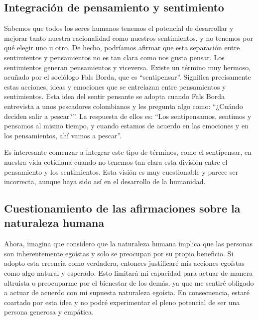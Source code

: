 \documentclass[
  letterpaper,
  DIV=11,
  numbers=noendperiod]{scrartcl}
\begin{document}
\hypertarget{integraciuxf3n-de-pensamiento-y-sentimiento}{%
\subsection{Integración de pensamiento y
sentimiento}\label{integraciuxf3n-de-pensamiento-y-sentimiento}}

Sabemos que todos los seres humanos tenemos el potencial de desarrollar
y mejorar tanto nuestra racionalidad como nuestros sentimientos, y no
tenemos por qué elegir uno u otro. De hecho, podríamos afirmar que esta
separación entre sentimientos y pensamientos no es tan clara como nos
gusta pensar. Los sentimientos generan pensamientos y viceversa. Existe
un término muy hermoso, acuñado por el sociólogo Fals Borda, que es
``sentipensar''. Significa precisamente estas acciones, ideas y
emociones que se entrelazan entre pensamientos y sentimientos. Esta idea
del sentir pensante se adopta cuando Fals Borda entrevista a unos
pescadores colombianos y les pregunta algo como: ``¿Cuándo deciden salir
a pescar?''. La respuesta de ellos es: ``Los sentipensamos, sentimos y
pensamos al mismo tiempo, y cuando estamos de acuerdo en las emociones y
en los pensamientos, ahí vamos a pescar''.

Es interesante comenzar a integrar este tipo de términos, como el
sentipensar, en nuestra vida cotidiana cuando no tenemos tan clara esta
división entre el pensamiento y los sentimientos. Esta visión es muy
cuestionable y parece ser incorrecta, aunque haya sido así en el
desarrollo de la humanidad.

\hypertarget{cuestionamiento-de-las-afirmaciones-sobre-la-naturaleza-humana}{%
\subsection{Cuestionamiento de las afirmaciones sobre la naturaleza
humana}\label{cuestionamiento-de-las-afirmaciones-sobre-la-naturaleza-humana}}

Ahora, imagina que considero que la naturaleza humana implica que las
personas son inherentemente egoístas y solo se preocupan por su propio
beneficio. Si adopto esta creencia como verdadera, entonces justificaré
mis acciones egoístas como algo natural y esperado. Esto limitará mi
capacidad para actuar de manera altruista o preocuparme por el bienestar
de los demás, ya que me sentiré obligado a actuar de acuerdo con mi
supuesta naturaleza egoísta. En consecuencia, estaré coartado por esta
idea y no podré experimentar el pleno potencial de ser una persona
generosa y empática.
\end{document}
